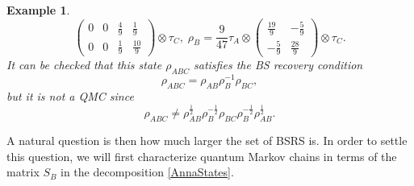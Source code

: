 \documentclass[11pt]{article}
\theoremstyle{newdefinition}
\theoremstyle{newplain}
\newtheorem{example}[definition]{Example}
\theoremstyle{myplain}
\DeclareMathOperator{\1}{\mathds{1}}
\begin{document}
\begin{example}
\begin{equation}
\begin{pmatrix}
        0 &0 &\frac{4}{9}&\frac{1}{9}\\
        0&0&\frac{1}{9}&\frac{10}{9}
    \end{pmatrix}\otimes \tau_C, \; \rho_B=\frac{9}{47}\tau_A\otimes \begin{pmatrix}
        \frac{19}{9}&-\frac{5}{9}\\
        -\frac{5}{9}&\frac{28}{9}
    \end{pmatrix}\otimes \tau_C .
\end{equation}
It can be checked that this state $\rho_{ABC}$ satisfies the BS recovery condition
\begin{equation}
    \rho_{ABC}=\rho_{AB} \rho_B^{-1} \rho_{BC},
\end{equation}
but it is not a QMC since
\begin{equation}
    \rho_{ABC}\neq \rho_{AB}^{\frac{1}{2}}\rho_B^{-\frac{1}{2}}\rho_{BC}\rho_B^{-\frac{1}{2}}\rho_{AB}^{\frac{1}{2}}.
\end{equation}
    
\end{example}

A natural question is then  how much larger the set of BSRS is. In order to settle this question, we will first characterize quantum Markov chains in terms of the matrix $S_B$ in the decomposition \eqref{AnnaStates}.
\end{document}
